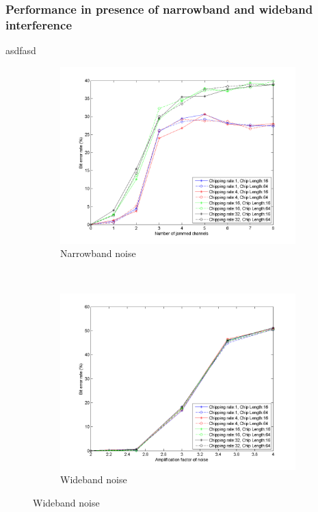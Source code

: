		\subsubsection{Performance in presence of narrowband and wideband interference}
		asdfasd		
		\begin{figure}[H]
			\centering
			\begin{subfigure}[b]{0.5\textwidth}
				\includegraphics[width=\textwidth]{imgs/results/plot_mode_fhss-test_narrowband-rep_20-dataRate_8-dataLength_128.png}
				\caption{Narrowband noise}
				\label{fig:fhss_narrowband}
			\end{subfigure}%
			~
			\begin{subfigure}[b]{0.5\textwidth}
				\includegraphics[width=\textwidth]{imgs/results/plot_mode_fhss-test_wideband-rep_20-dataRate_8-dataLength_128.png}
				\caption{Wideband noise}
				\label{fig:fhss_wideband}
			\end{subfigure}
		\end{figure}
		
